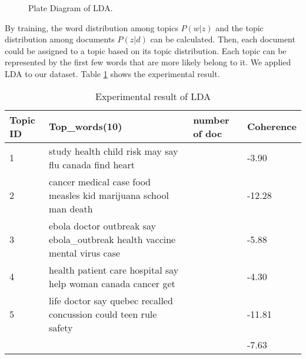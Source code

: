 \begin{figure}[!htp]
    \centering
    \caption{Plate Diagram of LDA.\cite{blei2003latent}}
    \label{fig:lda}
  \end{figure}
By training, the word distribution among topics $P(w|z)$ and the topic distribution among documents $P(z|d)$ can be calculated. Then, each document could be assigned to a topic based on its topic distribution. Each topic can be represented by the first few words that are more likely belong to it. We applied LDA to our dataset. Table \ref{tab:LDA1} shows the experimental result. 
\begin{table}[!htbp]
    \centering
    \hspace{0.5cm}
    \begin{tabular}{|p{45pt}|p{210pt}|p{80pt}|p{50pt}|}
        \hline
        Topic ID & Top\_words(10) & number of doc & Coherence \\ \hline
        1 & study health child risk may say flu canada find heart  & & -3.90\\ \hline
        2 & cancer medical case food measles kid marijuana school man death & & -12.28 \\ \hline
        3 & ebola doctor outbreak say ebola\_outbreak health vaccine mental virus case  & & -5.88 \\ \hline
        4 & health patient care hospital say help woman canada cancer get  & & -4.30 \\ \hline
        5 & life doctor say quebec recalled concussion could teen rule safety  & & -11.81 \\ \hline
        & & & -7.63 \\ \hline
       
    \end{tabular}
    \caption{Experimental result of LDA}
    \label{tab:LDA1}
\end{table}
